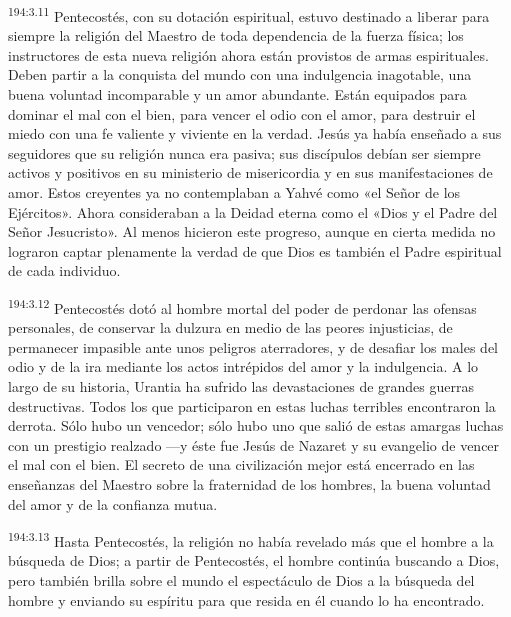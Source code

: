 \par 
\textsuperscript{194:3.11} Pentecostés, con su dotación espiritual, estuvo destinado a liberar para siempre la religión del Maestro de toda dependencia de la fuerza física; los instructores de esta nueva religión ahora están provistos de armas espirituales. Deben partir a la conquista del mundo con una indulgencia inagotable, una buena voluntad incomparable y un amor abundante. Están equipados para dominar el mal con el bien, para vencer el odio con el amor, para destruir el miedo con una fe valiente y viviente en la verdad. Jesús ya había enseñado a sus seguidores que su religión nunca era pasiva; sus discípulos debían ser siempre activos y positivos en su ministerio de misericordia y en sus manifestaciones de amor. Estos creyentes ya no contemplaban a Yahvé como «el Señor de los Ejércitos». Ahora consideraban a la Deidad eterna como el «Dios y el Padre del Señor Jesucristo». Al menos hicieron este progreso, aunque en cierta medida no lograron captar plenamente la verdad de que Dios es también el Padre espiritual de cada individuo.

\par 
\textsuperscript{194:3.12} Pentecostés dotó al hombre mortal del poder de perdonar las ofensas personales, de conservar la dulzura en medio de las peores injusticias, de permanecer impasible ante unos peligros aterradores, y de desafiar los males del odio y de la ira mediante los actos intrépidos del amor y la indulgencia. A lo largo de su historia, Urantia ha sufrido las devastaciones de grandes guerras destructivas. Todos los que participaron en estas luchas terribles encontraron la derrota. Sólo hubo un vencedor; sólo hubo uno que salió de estas amargas luchas con un prestigio realzado ---y éste fue Jesús de Nazaret y su evangelio de vencer el mal con el bien. El secreto de una civilización mejor está encerrado en las enseñanzas del Maestro sobre la fraternidad de los hombres, la buena voluntad del amor y de la confianza mutua.

\par 
\textsuperscript{194:3.13} Hasta Pentecostés, la religión no había revelado más que el hombre a la búsqueda de Dios; a partir de Pentecostés, el hombre continúa buscando a Dios, pero también brilla sobre el mundo el espectáculo de Dios a la búsqueda del hombre y enviando su espíritu para que resida en él cuando lo ha encontrado.

